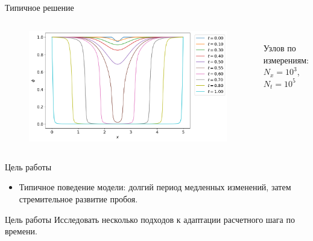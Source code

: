 \begin{frame}{Типичное решение}
\vspace{-0.4cm}
\begin{columns}
\begin{figure}
	\includegraphics[width=\textwidth]{figures/typical_solution.png}
\end{figure}
\hfill \\
\vspace{3.5cm}
\hspace{-2.5cm}
Узлов по измерениям: \\
\hspace{-2.5cm}
$N_x = 10^3$, $N_t = 10^5$
\end{columns}
\end{frame}


\begin{frame}{Цель работы}
\begin{itemize}
	\item Типичное поведение модели: долгий период медленных изменений, затем стремительное развитие пробоя.
\end{itemize}
\begin{block}{Цель работы}
	Исследовать несколько подходов к адаптации расчетного шага по времени.
\end{block}
\end{frame}